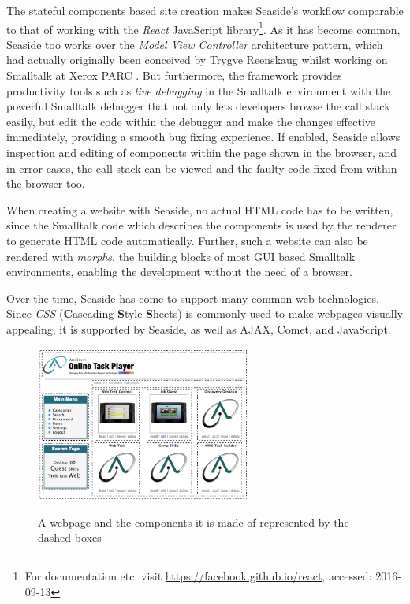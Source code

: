 \documentclass[a4paper,12pt,pagesize,headsepline,titlepage]{scrartcl}
\begin{document}
The stateful components based site creation makes Seaside's workflow comparable to that of working with the \emph{React} JavaScript library\footnote{For documentation etc. visit \url{https://facebook.github.io/react}, accessed: 2016-09-13}. As it has become common, Seaside too works over the \emph{Model View Controller} architecture pattern, which had actually originally been conceived by Trygve Reenskaug whilst working on Smalltalk at Xerox PARC \cite{reenskaug1979original}. But furthermore, the framework provides productivity tools such as \emph{live debugging} in the Smalltalk environment with the powerful Smalltalk debugger that not only lets developers browse the call stack easily, but edit the code within the debugger and make the changes effective immediately, providing a smooth bug fixing experience. If enabled, Seaside allows inspection and editing of components within the page shown in the browser, and in error cases, the call stack can be viewed and the faulty code fixed from within the browser too.

When creating a website with Seaside, no actual HTML code has to be written, since the Smalltalk code which describes the components is used by the renderer to generate HTML code automatically. Further, such a website can also be rendered with \emph{morphs}, the building blocks of most GUI based Smalltalk environments, enabling the development without the need of a browser. 

Over the time, Seaside has come to support many common web technologies. Since \emph{CSS} (\textbf{C}ascading \textbf{S}tyle \textbf{S}heets) is commonly used to make webpages visually  appealing, it is supported by Seaside, as well as AJAX, Comet, and JavaScript.

\begin{figure}[]
\begin{center}
\includegraphics*[width=0.63\textwidth]{images/components.png}\\
\caption{A webpage and the components it is made of represented by the dashed boxes}
\label{abb:comps}
\end{center}
\end{figure}
\end{document}
